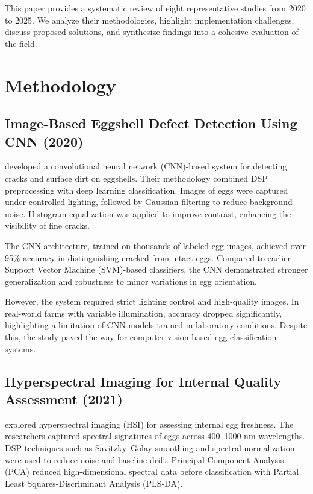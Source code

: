 \documentclass[conference]{IEEEtran}
\begin{document}
	This paper provides a systematic review of eight representative studies from 2020 to 2025. We analyze their methodologies, highlight implementation challenges, discuss proposed solutions, and synthesize findings into a cohesive evaluation of the field.
	
	\section{Methodology}
	
	\subsection{Image-Based Eggshell Defect Detection Using CNN (2020)}
	\cite{zhang2020cnn} developed a convolutional neural network (CNN)-based system for detecting cracks and surface dirt on eggshells. Their methodology combined DSP preprocessing with deep learning classification. Images of eggs were captured under controlled lighting, followed by Gaussian filtering to reduce background noise. Histogram equalization was applied to improve contrast, enhancing the visibility of fine cracks.  
	
	The CNN architecture, trained on thousands of labeled egg images, achieved over 95\% accuracy in distinguishing cracked from intact eggs. Compared to earlier Support Vector Machine (SVM)-based classifiers, the CNN demonstrated stronger generalization and robustness to minor variations in egg orientation.  
	
	However, the system required strict lighting control and high-quality images. In real-world farms with variable illumination, accuracy dropped significantly, highlighting a limitation of CNN models trained in laboratory conditions. Despite this, the study paved the way for computer vision-based egg classification systems.
	
	\subsection{Hyperspectral Imaging for Internal Quality Assessment (2021)}
	\cite{li2021hsi} explored hyperspectral imaging (HSI) for assessing internal egg freshness. The researchers captured spectral signatures of eggs across 400–1000 nm wavelengths. DSP techniques such as Savitzky–Golay smoothing and spectral normalization were used to reduce noise and baseline drift. Principal Component Analysis (PCA) reduced high-dimensional spectral data before classification with Partial Least Squares-Discriminant Analysis (PLS-DA).  
	
\end{document}
